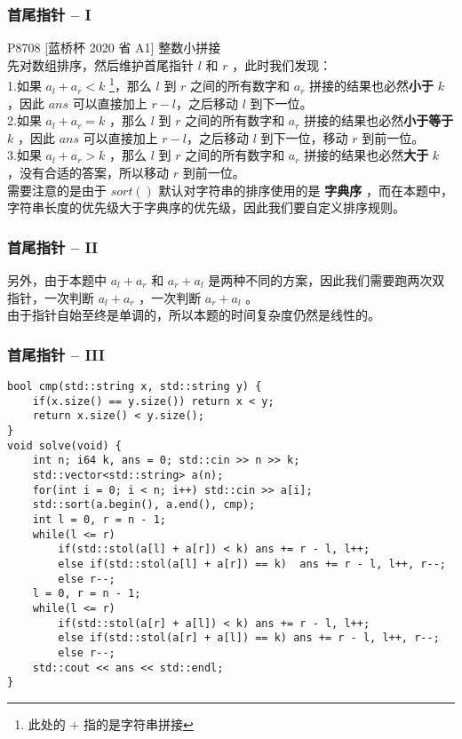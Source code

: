 \documentclass{beamer}
\newcommand{\fdf}[1]{\alert{\textbf{#1}}}
\begin{document}
\begin{frame}
\frametitle{首尾指针 -- I}
P8708 [蓝桥杯 2020 省 A1] 整数小拼接 \\ 
先对数组排序，然后维护首尾指针 $l$ 和 $r$ ，此时我们发现：\\ 
1.如果 $a_l + a_r < k$ \footnote{此处的 $+$ 指的是字符串拼接}，那么 $l$ 到 $r$ 之间的所有数字和 $a_r$ 拼接的结果也必然\fdf{小于} $k$ ，因此 $ans$ 可以直接加上 $r - l$，之后移动 $l$ 到下一位。 \\ 
2.如果 $a_l + a_r = k$ ，那么 $l$ 到 $r$ 之间的所有数字和 $a_r$ 拼接的结果也必然\fdf{小于等于} $k$ ，因此 $ans$ 可以直接加上 $r - l$，之后移动 $l$ 到下一位，移动 $r$ 到前一位。\\
3.如果 $a_l + a_r > k$ ，那么 $l$ 到 $r$ 之间的所有数字和 $a_r$ 拼接的结果也必然\fdf{大于} $k$ ，没有合适的答案，所以移动 $r$ 到前一位。 \\ 
需要注意的是由于 $sort()$ 默认对字符串的排序使用的是 \fdf{字典序} ，而在本题中，字符串长度的优先级大于字典序的优先级，因此我们要自定义排序规则。
\end{frame}
\begin{frame}
\frametitle{首尾指针 -- II}
另外，由于本题中 $a_l + a_r$ 和 $a_r + a_l$ 是两种不同的方案，因此我们需要跑两次双指针，一次判断 $a_l + a_r$ ，一次判断 $a_r + a_l$ 。 \\ 
由于指针自始至终是单调的，所以本题的时间复杂度仍然是线性的。
\end{frame}
\begin{frame}[fragile]
\frametitle{首尾指针 -- III}
\begin{onlyenv}
\begin{verbatim}
bool cmp(std::string x, std::string y) {
    if(x.size() == y.size()) return x < y;
    return x.size() < y.size();
}
void solve(void) {
    int n; i64 k, ans = 0; std::cin >> n >> k;
    std::vector<std::string> a(n);
    for(int i = 0; i < n; i++) std::cin >> a[i];
    std::sort(a.begin(), a.end(), cmp);
    int l = 0, r = n - 1;
    while(l <= r)
        if(std::stol(a[l] + a[r]) < k) ans += r - l, l++;
        else if(std::stol(a[l] + a[r]) == k)  ans += r - l, l++, r--;
        else r--;
    l = 0, r = n - 1;
    while(l <= r) 
        if(std::stol(a[r] + a[l]) < k) ans += r - l, l++;
        else if(std::stol(a[r] + a[l]) == k) ans += r - l, l++, r--;
        else r--;
    std::cout << ans << std::endl;
}
\end{verbatim}
\end{onlyenv}
\end{frame}
\end{document}
